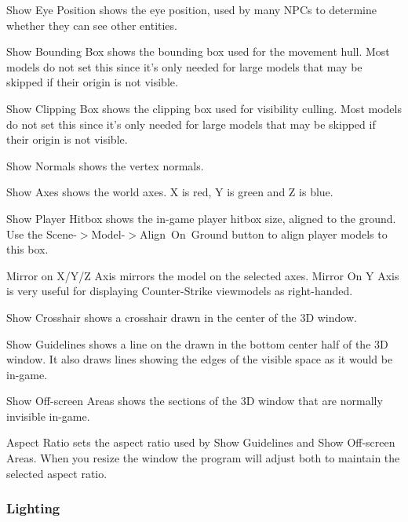 \documentclass[10pt, a4paper, titlepage, oneside]{article}
\begin{document}
\vspace{\baselineskip}
Show Eye Position shows the eye position, used by many NPCs to determine whether they can see other entities.

\vspace{\baselineskip}
Show Bounding Box shows the bounding box used for the movement hull. Most models do not set this since it's only needed for large models that may be skipped if their origin is not visible.

\vspace{\baselineskip}
Show Clipping Box shows the clipping box used for visibility culling. Most models do not set this since it's only needed for large models that may be skipped if their origin is not visible.

\vspace{\baselineskip}
Show Normals shows the vertex normals.

\vspace{\baselineskip}
Show Axes shows the world axes. X is red, Y is green and Z is blue.

\vspace{\baselineskip}
Show Player Hitbox shows the in-game player hitbox size, aligned to the ground. Use the \mbox{Scene-$>$Model-$>$Align On Ground} button to align player models to this box.

\vspace{\baselineskip}
Mirror on X/Y/Z Axis mirrors the model on the selected axes. Mirror On Y Axis is very useful for displaying Counter-Strike viewmodels as right-handed.

\vspace{\baselineskip}
Show Crosshair shows a crosshair drawn in the center of the 3D window.

\vspace{\baselineskip}
Show Guidelines shows a line on the drawn in the bottom center half of the 3D window. It also draws lines showing the edges of the visible space as it would be in-game.

\vspace{\baselineskip}
Show Off-screen Areas shows the sections of the 3D window that are normally invisible in-game.

\vspace{\baselineskip}
Aspect Ratio sets the aspect ratio used by Show Guidelines and Show Off-screen Areas. When you resize the window the program will adjust both to maintain the selected aspect ratio.

\subsubsection{Lighting}
\end{document}
